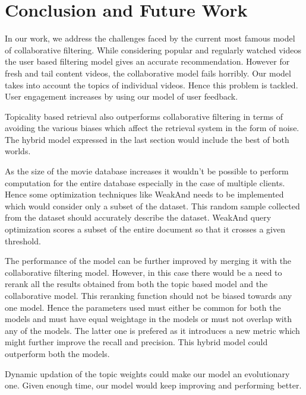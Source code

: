 \chapter{Conclusion and Future Work}

In our work, we address the challenges faced by the current most famous model of collaborative filtering. While considering popular and regularly watched videos the user based filtering model gives an accurate recommendation. However for fresh and tail content videos, the collaborative model fails horribly. Our model takes into account the topics of individual videos. Hence this problem is tackled. User engagement increases by using our model of user feedback. \par
Topicality based retrieval also outperforms collaborative filtering in terms of avoiding the various biases which affect the retrieval system in the form of noise. The hybrid model expressed in the last section would include the best of both worlds.\par
As the size of the movie database increases it wouldn’t be possible to perform computation for the entire database especially in the case of multiple clients. Hence some optimization techniques like WeakAnd needs to be implemented which would consider only a subset of the dataset. This random sample collected from the dataset should accurately describe the dataset. WeakAnd query optimization scores a subset of the entire document so that it crosses a given threshold. \par
The performance of the model can be further improved by merging it with the collaborative filtering model. However, in this case there would be a need to rerank all the results obtained from both the topic based model and the collaborative model. This reranking function should not be biased towards any one model. Hence the parameters used must either be common for both the models and must have equal weightage in the models or must not overlap with any of the models. The latter one is prefered as it introduces a new metric which might further improve the recall and precision. This hybrid model could outperform both the models.\par
Dynamic updation of the topic weights could make our model an evolutionary one. Given enough time, our model would keep improving and performing better.